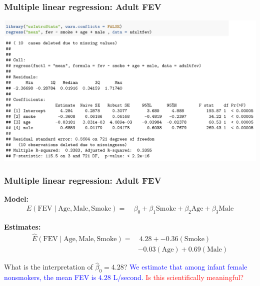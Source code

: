 \documentclass[12pt, 
hyperref={colorlinks=true, linkcolor=blue, urlcolor=cyan},dvipsnames]{beamer}
\begin{document}
\begin{frame}
\frametitle{Multiple linear regression: Adult FEV}
\begin{center}
\vspace{-1cm}\hspace*{-0.5cm}\includegraphics[width=1.1\textwidth]{plots/fev_vs_smoke_adjust_adultfev_noheight.png}
\end{center}
\end{frame}

\begin{frame}
\frametitle{Multiple linear regression: Adult FEV}
\vspace{-1cm}\textbf{Model:} {\small \begin{align*}
E(\text{FEV} \mid \text{Age}, \text{Male}, \text{Smoke}) =& \ \beta_0 + \beta_1 \text{Smoke} + \beta_2 \text{Age} + \beta_3 \text{Male} 
\end{align*} } \vspace{-1cm}

\textbf{Estimates:}
{\small \begin{align*}
\widehat{E}(\text{FEV} \mid \text{Age}, \text{Male}, \text{Smoke}) =& \ 4.28 + -0.36 (\text{Smoke}) \\
& -0.03 (\text{Age}) + 0.69 (\text{Male}) 
\end{align*} } \vspace{-1cm}

What is the interpretation of $\hat{\beta}_0 = 4.28$? \pause \textcolor{blue}{We estimate that among infant female nonsmokers, the mean FEV is $4.28$ L/second.} \textcolor{red}{Is this scientifically meaningful?}
\end{frame}
\end{document}
